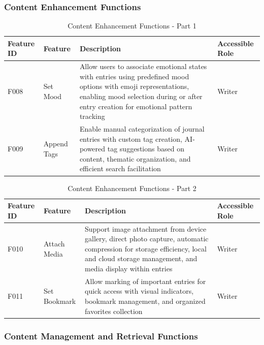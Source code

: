\newpage

\subsubsection{Content Enhancement Functions}

\begin{table}[H]
\centering
\caption{Content Enhancement Functions - Part 1}
\label{tab:content-enhancement-functions-1}
\begin{tabular}{|p{0.8cm}|p{2.2cm}|p{9.5cm}|p{1.5cm}|}
\hline
\textbf{Feature ID} & \textbf{Feature} & \textbf{Description} & \textbf{Accessible Role} \\
\hline
F008 & Set Mood & Allow users to associate emotional states with entries using predefined mood options with emoji representations, enabling mood selection during or after entry creation for emotional pattern tracking & Writer \\
\hline
F009 & Append Tags & Enable manual categorization of journal entries with custom tag creation, AI-powered tag suggestions based on content, thematic organization, and efficient search facilitation & Writer \\
\hline
\end{tabular}
\end{table}

\begin{table}[H]
\centering
\caption{Content Enhancement Functions - Part 2}
\label{tab:content-enhancement-functions-2}
\begin{tabular}{|p{0.8cm}|p{2.2cm}|p{9.5cm}|p{1.5cm}|}
\hline
\textbf{Feature ID} & \textbf{Feature} & \textbf{Description} & \textbf{Accessible Role} \\
\hline
F010 & Attach Media & Support image attachment from device gallery, direct photo capture, automatic compression for storage efficiency, local and cloud storage management, and media display within entries & Writer \\
\hline
F011 & Set Bookmark & Allow marking of important entries for quick access with visual indicators, bookmark management, and organized favorites collection & Writer \\
\hline
\end{tabular}
\end{table}

\subsubsection{Content Management and Retrieval Functions}

